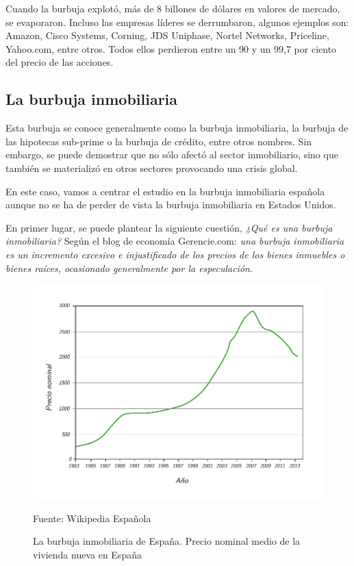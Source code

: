 Cuando la burbuja explotó, más de 8 billones de dólares en valores de mercado, se evaporaron. Incluso las empresas líderes se derrumbaron, algunos ejemplos son: Amazon, Cisco Systems, Corning, JDS Uniphase, Nortel Networks, Priceline, Yahoo.com, entre otros. Todos ellos perdieron entre un 90 y un 99,7 por ciento del precio de las acciones.

\subsection{La burbuja inmobiliaria} 
Esta burbuja se conoce generalmente como la burbuja inmobiliaria, la burbuja de las hipotecas sub-prime o la burbuja de crédito, entre otros nombres. Sin embargo, se puede demostrar que no sólo afectó al sector inmobiliario, sino que también se materializó en otros sectores provocando una crisis global.

En este caso, vamos a centrar el estudio en la burbuja inmobiliaria española aunque no se ha de perder de vista la burbuja inmobiliaria en Estados Unidos.

En primer lugar, se puede plantear la siguiente cuestión, \emph{¿Qué es una burbuja inmobiliaria?} Según el blog de economía Gerencie.com: \emph{una burbuja inmobiliaria es un incremento excesivo e injustificado de los precios de los bienes inmuebles o bienes raíces, ocasionado generalmente por la especulación}.

\begin{figure}[!h] 
\caption{La burbuja inmobiliaria de España. Precio nominal medio de la vivienda nueva en España} 
\centering \includegraphics[width=150mm]{capitulos/graficos/precioVivienda} 
\label{fig:precioVivienda} 

	\footnotesize
	Fuente: Wikipedia Española

\end{figure}


